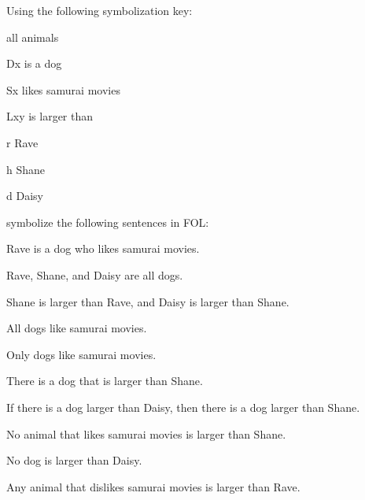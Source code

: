\problempart 
Using the following symbolization key:
\begin{ekey}
\item[\text{domain}] all animals
\item[Dx]  is a dog
\item[Sx]  likes samurai movies
\item[Lxy]  is larger than 
\item[r] Rave
\item[h] Shane
\item[d] Daisy
\end{ekey}
symbolize the following sentences in FOL:
\begin{earg}
\item Rave is a dog who likes samurai movies.
\item[] 
\item Rave, Shane, and Daisy are all dogs.
\item[] 
\item Shane is larger than Rave, and Daisy is larger than Shane.
\item[] 
\item All dogs like samurai movies.
\item[] 
\item Only dogs like samurai movies.
\item[] 
\item There is a dog that is larger than Shane.
\item[] 
\item If there is a dog larger than Daisy, then there is a dog larger than Shane.
\item[] 
\item No animal that likes samurai movies is larger than Shane.
\item[] 
\item No dog is larger than Daisy.
\item[] 
\item Any animal that dislikes samurai movies is larger than Rave.

\end{earg}
